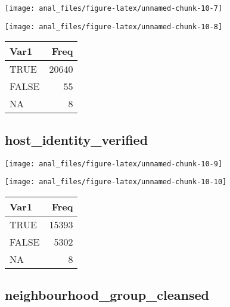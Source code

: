 \begin{center}\texttt{[image: anal\_files/figure-latex/unnamed-chunk-10-7]} \end{center}

\begin{center}\texttt{[image: anal\_files/figure-latex/unnamed-chunk-10-8]} \end{center}

\begin{table}[H]
\centering
\begin{tabular}[t]{lr}
\toprule
Var1 & Freq\\
\midrule
TRUE & 20640\\
FALSE & 55\\
NA & 8\\
\bottomrule
\end{tabular}
\end{table}
\pagebreak

\hypertarget{host_identity_verified}{%
\subsection{host\_identity\_verified}\label{host_identity_verified}}

\begin{center}\texttt{[image: anal\_files/figure-latex/unnamed-chunk-10-9]} \end{center}

\begin{center}\texttt{[image: anal\_files/figure-latex/unnamed-chunk-10-10]} \end{center}

\begin{table}[H]
\centering
\begin{tabular}[t]{lr}
\toprule
Var1 & Freq\\
\midrule
TRUE & 15393\\
FALSE & 5302\\
NA & 8\\
\bottomrule
\end{tabular}
\end{table}
\pagebreak

\hypertarget{neighbourhood_group_cleansed}{%
\subsection{neighbourhood\_group\_cleansed}\label{neighbourhood_group_cleansed}}

